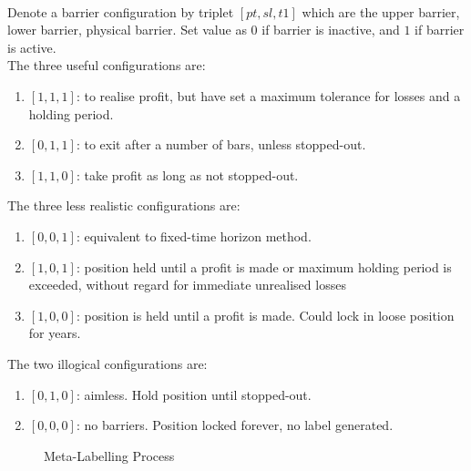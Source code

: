 \begin{remark} \\
Denote a barrier configuration by triplet $[pt, sl, t1]$ which are the upper barrier, lower barrier, physical barrier. Set value as $0$ if barrier is inactive, and $1$ if barrier is active.\\
The three useful configurations are:
\begin{enumerate}[label=\roman*.]
\setlength{\itemsep}{0pt}
\item $[1,1,1]$: to realise profit, but have set a maximum tolerance for losses and a holding period.
\item $[0,1,1]$: to exit after a number of bars, unless stopped-out.
\item $[1,1,0]$: take profit as long as not stopped-out.
\end{enumerate}
The three less realistic configurations are:
\begin{enumerate}[label=\roman*.]
\setlength{\itemsep}{0pt}
\item $[0,0,1]$: equivalent to fixed-time horizon method. 
\item $[1,0,1]$: position held until a profit is made or maximum holding period is exceeded, without regard for immediate unrealised losses
\item $[1,0,0]$: position is held until a profit is made. Could lock in loose position for years.
\end{enumerate}
The two illogical configurations are:
\begin{enumerate}[label=\roman*.]
\setlength{\itemsep}{0pt}
\item $[0,1,0]$: aimless. Hold position until stopped-out.
\item $[0,0,0]$: no barriers. Position locked forever, no label generated.
\end{enumerate}
\end{remark}

\begin{figure}[H]
\centering
\scalebox{0.75}{}
\caption{Meta-Labelling Process}
\label{fig:metalabel}
\end{figure}

